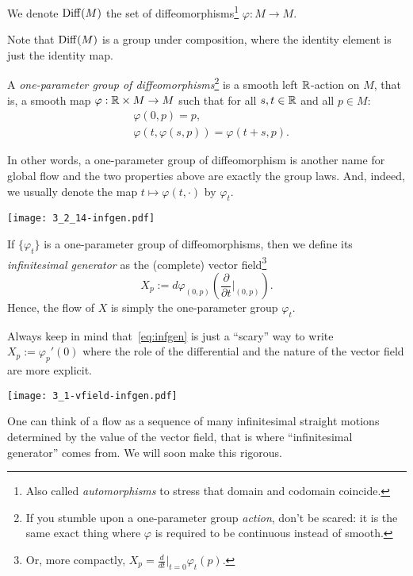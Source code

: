 \begin{definition}
  We denote $\operatorname{Diff}(M)$ the set of diffeomorphisms\footnote{Also called \emph{automorphisms} to stress that domain and codomain coincide.} $\varphi: M \to M$.

  Note that $\operatorname{Diff}(M)$ is a group under composition, where the identity element is just the identity map.
\end{definition}

\begin{definition}
  A \emph{one-parameter group of diffeomorphisms}\footnote{If you stumble upon a one-parameter group \emph{action}, don't be scared: it is the same exact thing where $\varphi$ is required to be continuous instead of smooth.} is a smooth left $\mathbb{R}$-action on $M$, that is, a smooth map $\varphi:\mathbb{R}\times M \to M$ such that for all $s,t\in\mathbb{R}$ and all $p\in M$:
  \begin{align}
     & \varphi(0,p) = p,                            \\
     & \varphi(t, \varphi(s, p)) = \varphi(t+s, p).
  \end{align}

  In other words, a one-parameter group of diffeomorphism is another name for global flow and the two properties above are exactly the group laws.
  And, indeed, we usually denote the map $t\mapsto\varphi(t,\cdot)$ by $\varphi_t$.


  \begin{marginfigure}
    \texttt{[image: 3\_2\_14-infgen.pdf]}
  \end{marginfigure}
  If $\{\varphi_t\}$ is a one-parameter group of diffeomorphisms, then we define its \emph{infinitesimal generator} as the (complete) vector field\footnote{Or, more compactly, ${X_p = \frac{d}{dt}\big|_{t=0}\varphi_t(p)}$.}
  \begin{equation}\label{eq:infgen}
    X_p := d\varphi_{(0,p)}\left(\frac{\partial}{\partial t}\Big|_{(0,p)}\right).
  \end{equation}
  Hence, the flow of $X$ is simply the one-parameter group $\varphi_t$.

  Always keep in mind that~\eqref{eq:infgen} is just a ``scary'' way to write $X_p := \varphi_p'(0)$ where the role of the differential and the nature of the vector field are more explicit.
\end{definition}
\begin{marginfigure}
  \texttt{[image: 3\_1-vfield-infgen.pdf]}%
  \caption{One can think of a flow as a sequence of many infinitesimal straight motions determined by the value of the vector field, that is where ``infinitesimal generator'' comes from. We will soon make this rigorous.}%
  \label{fig:3_1-vfield-infgen}
\end{marginfigure}

